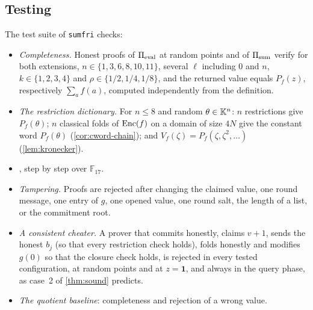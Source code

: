 \subsection{Testing}\label{sec:impl:tests}

The test suite of \texttt{sumfri} checks:
\begin{itemize}
  \item \emph{Completeness.} Honest proofs of $\Pi_{\mathrm{eval}}$ at random points and of $\Pi_{\mathrm{sum}}$ verify for both extensions, $n \in \{1, 3, 6, 8, 10, 11\}$, several $\ell$ including $0$ and $n$, $k \in \{1, 2, 3, 4\}$ and $\rho \in \{1/2, 1/4, 1/8\}$, and the returned value equals $P_f(z)$, respectively $\sum_a f(a)$, computed independently from the definition.
  \item \emph{The restriction dictionary.} For $n \le 8$ and random $\theta \in \mathbb{K}^n$: $n$ restrictions give $P_f(\theta)$; $n$ classical folds of $\mathrm{Enc}(f)$ on a domain of size $4N$ give the constant word $P_f(\theta)$ (\cref{cor:cword-chain}); and $V_f(\zeta) = P_f(\zeta, \zeta^2, \dots)$ (\cref{lem:kronecker}).
  \item \emph{}, step by step over $\mathbb{F}_{17}$.
  \item \emph{Tampering.} Proofs are rejected after changing the claimed value, one round message, one entry of $g$, one opened value, one round salt, the length of a list, or the commitment root.
  \item \emph{A consistent cheater.} A prover that commits honestly, claims $v + 1$, sends the honest $b_j$ (so that every restriction check holds), folds honestly and modifies $g(0)$ so that the closure check holds, is rejected in every tested configuration, at random points and at $z = \mathbf 1$, and always in the query phase, as case~2 of \cref{thm:sound} predicts.
  \item \emph{The quotient baseline}: completeness and rejection of a wrong value.
\end{itemize}
